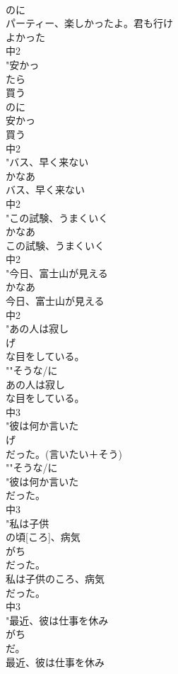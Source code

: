 \documentclass[8pt]{extreport}
\begin{document}
\begin{CJK}{UTF8}{min}
\\	のに
\\	パーティー、楽しかったよ。君も行け
\\	よかった
\\	中2
\\	"安かっ
\\	たら
\\	買う
\\	のに
\\	安かっ
\\	買う
\\	中2
\\	"バス、早く来ない
\\	かなあ
\\	バス、早く来ない
\\	中2
\\	"この試験、うまくいく
\\	かなあ
\\	この試験、うまくいく
\\	中2
\\	"今日、富士山が見える
\\	かなあ
\\	今日、富士山が見える
\\	中2
\\	"あの人は寂し
\\	げ
\\	な目をしている。
\\	""そうな/に
\\	あの人は寂し
\\	な目をしている。
\\	中3
\\	"彼は何か言いた
\\	げ
\\	だった。(言いたい＋そう)
\\	""そうな/に
\\	"彼は何か言いた
\\	だった。
\\	中3
\\	"私は子供
\\	の頃[ころ]、病気
\\	がち
\\	だった。
\\	私は子供のころ、病気
\\	だった。
\\	中3
\\	"最近、彼は仕事を休み
\\	がち
\\	だ。
\\	最近、彼は仕事を休み

\end{CJK}
\end{document}
